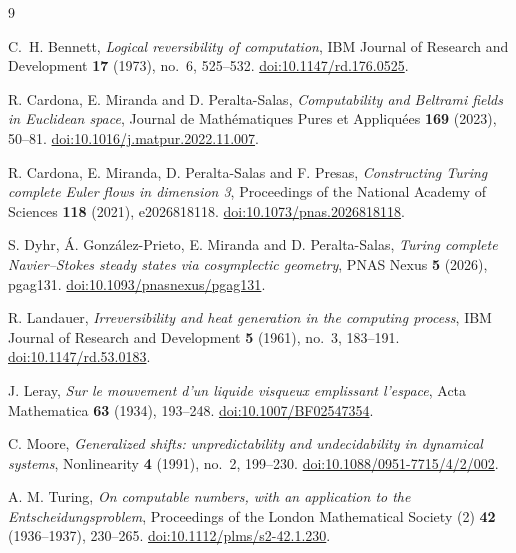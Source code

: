 \documentclass[11pt]{article}
\theoremstyle{remark}
\begin{document}
\begin{thebibliography}{9}
\raggedright
{}
C.~H. Bennett,
\emph{Logical reversibility of computation},
IBM Journal of Research and Development \textbf{17} (1973), no.~6,
525--532.
\href{https://doi.org/10.1147/rd.176.0525}{doi:10.1147/rd.176.0525}.

R. Cardona, E. Miranda and D. Peralta-Salas,
\emph{Computability and Beltrami fields in Euclidean space},
Journal de Math\'ematiques Pures et Appliqu\'ees \textbf{169} (2023), 50--81.
\href{https://doi.org/10.1016/j.matpur.2022.11.007}{doi:10.1016/j.matpur.2022.11.007}.

R. Cardona, E. Miranda, D. Peralta-Salas and F. Presas,
\emph{Constructing Turing complete Euler flows in dimension 3},
Proceedings of the National Academy of Sciences \textbf{118} (2021),
e2026818118.
\href{https://doi.org/10.1073/pnas.2026818118}{doi:10.1073/pnas.2026818118}.

S. Dyhr, \'A. Gonz\'alez-Prieto, E. Miranda and D. Peralta-Salas,
\emph{Turing complete Navier--Stokes steady states via cosymplectic geometry},
PNAS Nexus \textbf{5} (2026), pgag131.
\href{https://doi.org/10.1093/pnasnexus/pgag131}{doi:10.1093/pnasnexus/pgag131}.

R. Landauer,
\emph{Irreversibility and heat generation in the computing process},
IBM Journal of Research and Development \textbf{5} (1961), no.~3,
183--191.
\href{https://doi.org/10.1147/rd.53.0183}{doi:10.1147/rd.53.0183}.

J. Leray,
\emph{Sur le mouvement d'un liquide visqueux emplissant l'espace},
Acta Mathematica \textbf{63} (1934), 193--248.
\href{https://doi.org/10.1007/BF02547354}{doi:10.1007/BF02547354}.

C. Moore,
\emph{Generalized shifts: unpredictability and undecidability in
dynamical systems},
Nonlinearity \textbf{4} (1991), no.~2, 199--230.
\href{https://doi.org/10.1088/0951-7715/4/2/002}{doi:10.1088/0951-7715/4/2/002}.

A. M. Turing, \emph{On computable numbers, with an application to the
Entscheidungsproblem}, Proceedings of the London Mathematical Society (2)
\textbf{42} (1936--1937), 230--265.
\href{https://doi.org/10.1112/plms/s2-42.1.230}{doi:10.1112/plms/s2-42.1.230}.
\end{thebibliography}
\end{document}
